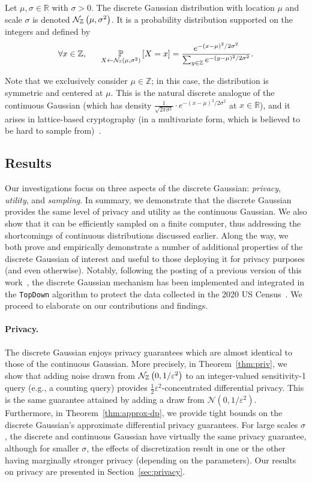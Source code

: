 \documentclass{jpc}
\newcommand{\dgausss}[2]{{\discN\left(#1,#2\right)}}
\newcommand{\dgauss}[1]{\dgausss{0}{#1}}
\newcommand{\pr}[2]{{\ifx&#1& \mathbb{P} \else
\underset{#1}{\mathbb{P}} \fi \left[#2\right]}}
\newcommand{\eps}{\varepsilon}
\newcommand{\Z}{\mathbb{Z}}
\newcommand{\R}{\mathbb{R}}
\begin{document}
\begin{defi}
Let $\mu,\sigma\in\R$ with $\sigma > 0$. The discrete Gaussian distribution with location $\mu$ and scale $\sigma$ is denoted $\dgausss{\mu}{\sigma^2}$. It is a probability distribution supported on the integers and defined by 
\begin{equation}
\forall x \in \Z, ~~~~~ \pr{X \gets \dgausss{\mu}{\sigma^2}}{X=x}=\frac{e^{-(x-\mu)^2/2\sigma^2}}{\sum_{y \in \Z} e^{-(y-\mu)^2/2\sigma^2}}.
\end{equation}
\end{defi}
Note that we exclusively consider $\mu \in \Z$; in this case, the distribution is symmetric and centered at $\mu$. This is the natural discrete analogue of the continuous Gaussian (which has density $\frac{1}{\sqrt{2\pi\sigma^2}} \cdot e^{-(x-\mu)^2/2\sigma^2}$ at $x \in \R$), and it arises in lattice-based cryptography (in a multivariate form, which is believed to be hard to sample from)~\cite[etc.]{GentryPV08,Regev09,Peikert10,Stephens-Davidowitz17}.

\subsection{Results}

Our investigations focus on three aspects of the discrete Gaussian: \emph{privacy}, \emph{utility}, and \emph{sampling}. In summary, we demonstrate that the discrete Gaussian provides the same level of privacy and utility as the continuous Gaussian. We also show that it can be efficiently sampled on a finite computer, thus addressing the shortcomings of continuous distributions discussed earlier. Along the way, we both prove and empirically demonstrate a number of additional properties of the discrete Gaussian of interest and useful to those deploying it for privacy purposes (and even otherwise). Notably, following the posting of a previous version of this work~\cite{CKS20}, the discrete Gaussian mechanism has been implemented and integrated in the \texttt{TopDown} algorithm to protect the data collected in the 2020 US Census~\citep{DAS21}. We proceed to elaborate on our contributions and findings.

\paragraph{Privacy.} The discrete Gaussian enjoys privacy guarantees which are almost identical to those of the continuous Gaussian. More precisely, in Theorem~\ref{thm:priv}, we show that adding noise drawn from $\dgauss{1/\eps^2}$ to an integer-valued sensitivity-1 query (e.g., a counting query) provides $\frac12 \eps^2$-concentrated differential privacy. This is the same guarantee attained by adding a draw from $\mathcal{N}(0,1/\eps^2)$. Furthermore, in Theorem~\ref{thm:approx-dp}, we provide tight bounds on the discrete Gaussian's approximate differential privacy guarantees. For large scales $\sigma$, the discrete and continuous Gaussian have virtually the same privacy guarantee, although for smaller $\sigma$, the effects of discretization result in one or the other having marginally stronger privacy (depending on the parameters). Our results on privacy are presented in Section~\ref{sec:privacy}.
\end{document}
